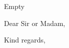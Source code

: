 \documentclass[
    a4paper,
    11pt,
    addrfield=off, %
    foldmarks=off  %
]{scrlttr2}
\begin{document}
    \begin{letter}{Empty}
        \opening{Dear Sir or Madam,}
        \blindtext
        \closing{Kind regards,}
    \end{letter}
    
\end{document}
